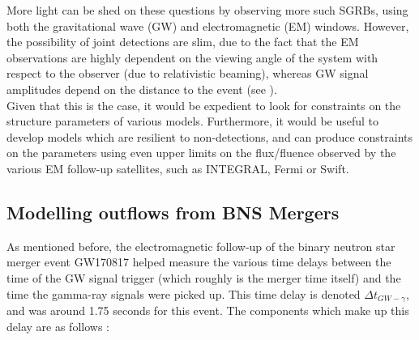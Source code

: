     More light can be shed on these questions by observing more such SGRBs, using both
    the gravitational wave (GW) and electromagnetic (EM) windows.  However, the
    possibility of joint detections are slim, due to the fact that the EM observations
    are highly dependent on the viewing angle of the system with respect to the observer
    (due to relativistic beaming), whereas GW signal amplitudes depend on the distance
    to the event (see ).\\
    Given that this is the case, it would be expedient to look for constraints on the
    structure parameters of various models.  Furthermore, it would be useful to develop
    models which are resilient to non-detections, and can produce constraints on the
    parameters using even upper limits on the flux/fluence observed by the various EM
    follow-up satellites, such as INTEGRAL, Fermi or Swift.\\

    \subsection{Modelling outflows from BNS Mergers}\label{ssec:bns-outflows}

    As mentioned before, the electromagnetic follow-up of the binary neutron star merger
    event GW170817 helped measure the various time delays between the time of the GW
    signal trigger (which roughly is the merger time itself) and the time the gamma-ray
    signals were picked up. This time delay is denoted $\Delta t_{GW-\gamma}$, and was
    around 1.75 seconds for this event.  The components which make up this delay are as
    follows \cite{lazzati_2020}:

